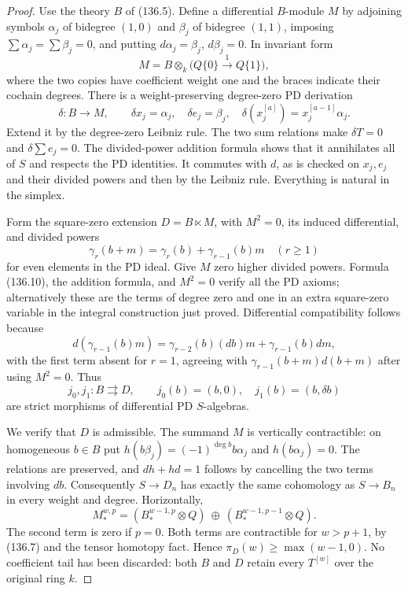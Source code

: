 \documentclass[11pt,a4paper]{article}
\theoremstyle{definition}\newtheorem{definition}[theorem]{Definition}
\theoremstyle{remark}\newtheorem{remark}[theorem]{Remark}
\begin{document}
\begin{proof}
Use the theory $B$ of (136.5).  Define a differential
$B$-module $M$ by adjoining symbols $\alpha_j$ of bidegree
$(1,0)$ and $\beta_j$ of bidegree $(1,1)$, imposing
$\sum\alpha_j=\sum\beta_j=0$, and putting
$d\alpha_j=\beta_j$, $d\beta_j=0$.
In invariant form
\[
 M=B\otimes_k\bigl(Q\{0\}\xrightarrow{1}Q\{1\}\bigr),
                                                               \tag{136.8}
\]
where the two copies have coefficient weight one and the
braces indicate their cochain degrees.  There is a
weight-preserving degree-zero PD derivation
\[
 \delta:B\longrightarrow M,\qquad
 \delta x_j=\alpha_j,\quad\delta e_j=\beta_j,\quad
 \delta(x_j^{[a]})=x_j^{[a-1]}\alpha_j .                    \tag{136.9}
\]
Extend it by the degree-zero Leibniz rule.  The two sum
relations make $\delta T=0$ and $\delta\sum e_j=0$.
The divided-power addition formula shows that it annihilates
all of $S$ and respects the PD identities.  It commutes
with $d$, as is checked on $x_j,e_j$ and their divided
powers and then by the Leibniz rule.  Everything is natural
in the simplex.

Form the square-zero extension $D=B\ltimes M$, with
$M^2=0$, its induced differential, and divided powers
\[
 \gamma_r(b+m)=\gamma_r(b)+\gamma_{r-1}(b)m
 \quad(r\geq1)                                             \tag{136.10}
\]
for even elements in the PD ideal.  Give $M$ zero higher
divided powers.  Formula (136.10), the addition formula,
and $M^2=0$ verify all the PD axioms; alternatively these
are the terms of degree zero and one in an extra
square-zero variable in the integral construction just
proved.  Differential compatibility follows because
\[
 d(\gamma_{r-1}(b)m)
  =\gamma_{r-2}(b)(db)m+\gamma_{r-1}(b)dm,
\]
with the first term absent for $r=1$, agreeing with
$\gamma_{r-1}(b+m)d(b+m)$ after using $M^2=0$.
Thus
\[
 j_0,j_1:B\rightrightarrows D,
 \qquad j_0(b)=(b,0),\quad j_1(b)=(b,\delta b)              \tag{136.11}
\]
are strict morphisms of differential PD $S$-algebras.

We verify that $D$ is admissible.  The summand $M$ is
vertically contractible: on homogeneous $b\in B$ put
$h(b\beta_j)=(-1)^{\deg b}b\alpha_j$ and
$h(b\alpha_j)=0$.  The relations are preserved, and
$dh+hd=1$ follows by cancelling the two terms involving
$db$.  Consequently $S\to D_n$ has exactly the same
cohomology as $S\to B_n$ in every weight and degree.
Horizontally,
\[
 M_*^{w,p}=
  (B_*^{w-1,p}\otimes Q)\ \oplus\
  (B_*^{w-1,p-1}\otimes Q).                                \tag{136.12}
\]
The second term is zero if $p=0$.  Both terms are
contractible for $w>p+1$, by (136.7) and the tensor
homotopy fact.  Hence $\pi_D(w)\geq\max(w-1,0)$.
No coefficient tail has been discarded: both $B$ and
$D$ retain every $T^{[w]}$ over the original ring $k$.


\end{proof}
\end{document}
